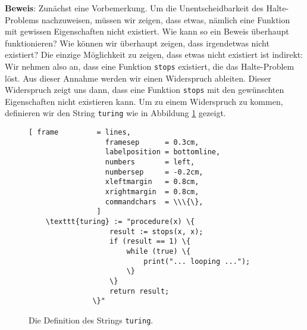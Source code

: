 \noindent
\textbf{Beweis}:  Zunächst eine Vorbemerkung.  Um die Unentscheidbarkeit des
Halte-Problems nachzuweisen, müssen wir zeigen, dass etwas, nämlich eine Funktion mit
gewissen Eigenschaften nicht existiert.  Wie kann so ein Beweis überhaupt funktionieren?
Wie können wir überhaupt zeigen, dass irgendetwas nicht existiert?
Die einzige Möglichkeit zu zeigen, dass etwas nicht existiert ist indirekt:
Wir nehmen also an, dass eine Funktion \texttt{stops} existiert, die das Halte-Problem löst.
Aus dieser Annahme werden wir einen Widerspruch ableiten.  Dieser Widerspruch zeigt
uns dann, dass eine Funktion \texttt{stops} mit den gewünschten Eigenschaften nicht
existieren kann.
Um zu einem Widerspruch zu kommen, definieren wir den String \texttt{turing} wie in Abbildung
\ref{fig:turing-string} gezeigt.

\begin{figure}[!h]
  \centering
\begin{Verbatim}[ frame         = lines, 
                  framesep      = 0.3cm, 
                  labelposition = bottomline,
                  numbers       = left,
                  numbersep     = -0.2cm,
                  xleftmargin   = 0.8cm,
                  xrightmargin  = 0.8cm,
                  commandchars  = \\\{\},
                ]
    \texttt{turing} := "procedure(x) \{
                   result := stops(x, x);
                   if (result == 1) \{
                       while (true) \{
                           print("... looping ...");
                       \}
                   \}
                   return result;
               \}"
\end{Verbatim}
  \vspace*{-0.3cm}
  \caption{Die Definition des Strings \texttt{turing}.}
  \label{fig:turing-string}
\end{figure}

